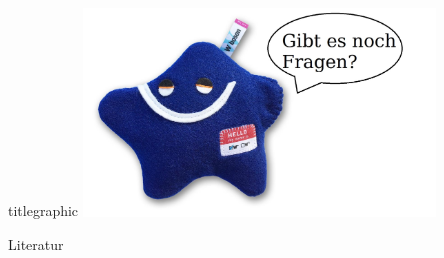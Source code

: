 \documentclass[aspectratio=1610, 9pt]{beamer}
\begin{document}
\section{}

\begin{frame}
  \begin{beamercolorbox}[center, wd=\textwidth]{titlegraphic}
    \includegraphics[width=0.7\textwidth]{images/particle_zoo.jpg}
  \end{beamercolorbox}%
\end{frame}


%

\begin{frame}[allowframebreaks]{Literatur}
  \printbibliography
\end{frame}

\nocite{comparison}
\nocite{tevatron}
\nocite{particle_zoo}
\end{document}
